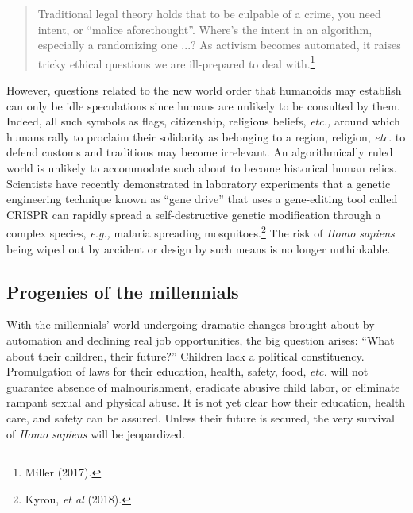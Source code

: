 \begin{multicols}{2}
\begin{quote}
Traditional legal theory holds that to be culpable of a crime, you need intent, or “malice aforethought”. Where's the intent in an algorithm, especially a randomizing one ...? As activism becomes automated, it raises tricky ethical questions we are ill-prepared to deal with.\footnote{Miller (2017).}
\end{quote}

However, questions related to the new world order that humanoids may establish can only be idle speculations since humans are unlikely to be consulted by them. Indeed, all such symbols as flags, citizenship, religious beliefs, \textit{etc.,} around which humans rally to proclaim their solidarity as belonging to a region, religion, \textit{etc.} to defend customs and traditions may become irrelevant. An algorithmically ruled world is unlikely to accommodate such about to become historical human relics. Scientists have recently demonstrated in laboratory experiments that a genetic engineering technique known as “gene drive” that uses a gene-editing tool called CRISPR can rapidly spread a self-destructive genetic modification through a complex species, \textit{e.g.,} malaria spreading mosquitoes.\footnote{Kyrou, \textit{et al} (2018).}  The risk of \textit{Homo sapiens} being wiped out by accident or design by such means is no longer unthinkable.

\subsection{Progenies of the millennials}

With the millennials' world undergoing dramatic changes brought about by automation and declining real job opportunities, the big question arises: “What about their children, their future?” Children lack a political constituency. Promulgation of laws for their education, health, safety, food, \textit{etc.} will not guarantee absence of malnourishment, eradicate abusive child labor, or eliminate rampant sexual and physical abuse. It is not yet clear how their education, health care, and safety can be assured. Unless their future is secured, the very survival of \textit{Homo sapiens} will be jeopardized.


\end{multicols}
